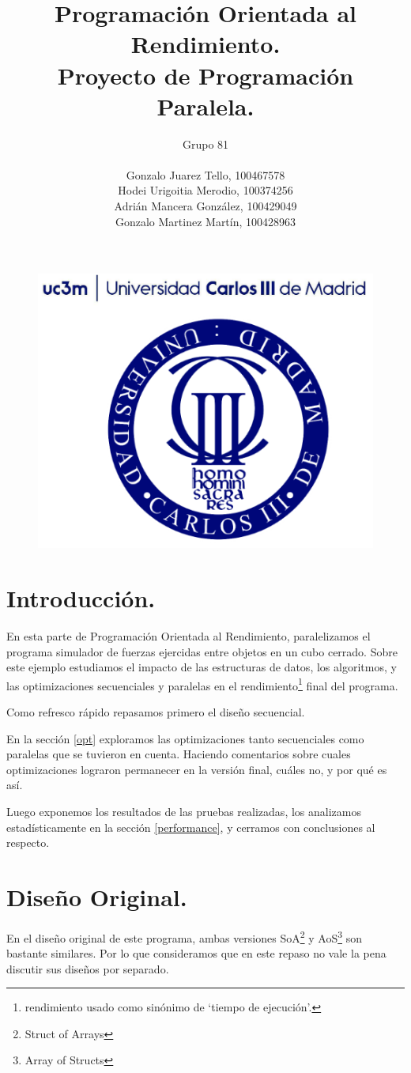 \documentclass{article}
\title{Programación Orientada al Rendimiento.\\Proyecto de Programación Paralela.}
\author{Grupo 81\\ \\
	Gonzalo Juarez Tello, 100467578\\
	Hodei Urigoitia Merodio, 100374256\\
	Adrián Mancera González, 100429049\\
	Gonzalo Martinez Martín, 100428963
}
\date{}
\begin{document}
\begin{figure}
	\includegraphics[width=\linewidth,height=0.7\textwidth]{resources/logo_uc3m.png}
\end{figure}
\maketitle
\newpage

\tableofcontents
\newpage

\section{Introducción.\label{intro}}
En esta parte de Programación Orientada al Rendimiento, paralelizamos
el programa simulador de fuerzas ejercidas entre objetos
en un cubo cerrado. Sobre este ejemplo estudiamos el impacto de las
estructuras de datos, los algoritmos, y las optimizaciones secuenciales
y paralelas en el rendimiento\footnote{rendimiento usado como sinónimo de
`tiempo de ejecución'.} final del programa.

Como refresco rápido repasamos primero el diseño secuencial.


En la sección \ref{opt} exploramos las optimizaciones tanto secuenciales como
paralelas que se tuvieron en cuenta. Haciendo comentarios
sobre cuales optimizaciones lograron permanecer en la versión final, cuáles no, y por qué es así.


Luego exponemos los resultados de las pruebas realizadas, los analizamos estadísticamente en la sección \ref{performance},
y cerramos con conclusiones al respecto.

\section{Diseño Original.\label{original}}
En el diseño original de este programa, ambas versiones SoA\footnote{Struct of Arrays} y AoS\footnote{Array of Structs}
son bastante similares. Por lo que consideramos que en este repaso no vale la pena discutir sus diseños por separado.
\end{document}
